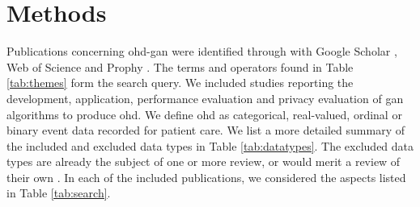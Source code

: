 \section{Methods}

    
    
    Publications concerning \gls{ohd-gan} were identified through with Google Scholar \cite{scholar}, Web of Science \cite{Clarivate} and Prophy \cite{Prophy}. The terms and operators found in Table \ref{tab:themes} form the search query. We included studies reporting the development, application, performance evaluation and privacy evaluation of \gls{gan} algorithms to produce \gls{ohd}. We define \gls{ohd} as categorical, real-valued, ordinal or binary event data recorded for patient care. We list a more detailed summary of the included and excluded data types in Table \ref{tab:datatypes}. The excluded data types are already the subject of one or more review, or would merit a review of their own \cite{Yi_2019, Nakata2019, Anwar_2018, Wang2020, Zhou2020}. In each of the included publications, we considered the aspects listed in Table \ref{tab:search}.\par

        
    
    
  
    
    







